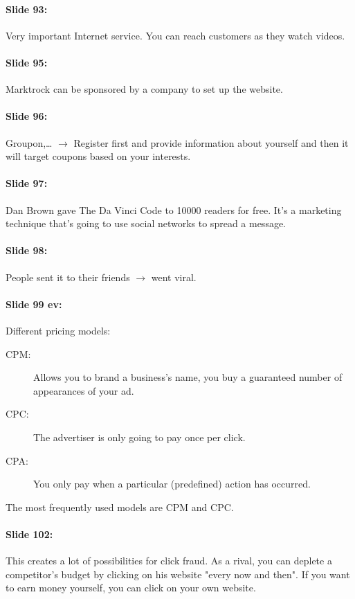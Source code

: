 \documentclass[10pt,a4paper]{report}
\begin{document}
\paragraph{Slide 93:}Very important Internet service. You can reach customers as they watch videos. 

\paragraph{Slide 95:}Marktrock can be sponsored by a company to set up the website. 

\paragraph{Slide 96:}Groupon,… $\rightarrow$ Register first and provide information about yourself and then it will target coupons based on your interests. 

\paragraph{Slide 97:}Dan Brown gave The Da Vinci Code to 10000 readers for free. It's a marketing technique that's going to use social networks to spread a message.

\paragraph{Slide 98:}People sent it to their friends $\rightarrow$ went viral.

\paragraph{Slide 99 ev:} Different pricing models:
\begin{description}
\item[CPM:]Allows you to brand a business's name, you buy a guaranteed number of appearances of your ad.
\item[CPC:]The advertiser is only going to pay once per click.
\item[CPA:]You only pay when a particular (predefined) action has occurred. 
\end{description}
The most frequently used models are CPM and CPC.

\paragraph{Slide 102:}This creates a lot of possibilities for click fraud. As a rival, you can deplete a competitor's budget by clicking on his website "every now and then". If you want to earn money yourself, you can click on your own website. 
\end{document}

